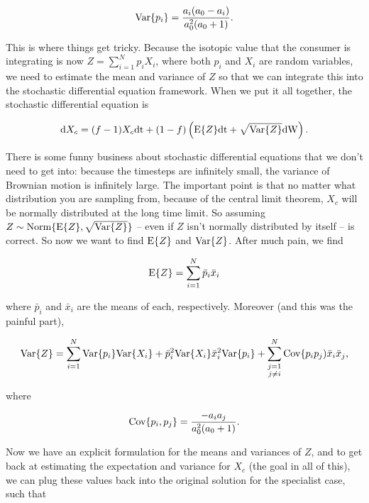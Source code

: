 \documentclass[11pt]{article}
\begin{document}
\begin{equation}
	{\rm Var}\{p_i\} = \frac{a_i(a_0 - a_i)}{a_0^2(a_0 + 1)}.
\end{equation}

This is where things get tricky.
Because the isotopic value that the consumer is integrating is now $Z = \sum_{i=1}^Np_iX_i$, where both $p_i$ and $X_i$ are random variables, we need to estimate the mean and variance of $Z$ so that we can integrate this into the stochastic differential equation framework.
When we put it all together, the stochastic differential equation is

\begin{equation}
{\rm d}X_c = (f-1)X_c{\rm dt} + (1-f)\left({\rm E}\{Z\} {\rm dt} + \sqrt{{\rm Var}\{Z\}}{\rm dW}\right).
\end{equation}

There is some funny business about stochastic differential equations that we don't need to get into: because the timesteps are infinitely small, the variance of Brownian motion is infinitely large.
The important point is that no matter what distribution you are sampling from, because of the central limit theorem, $X_c$ will be normally distributed at the long time limit.
So assuming $Z \sim {\rm Norm}\{{\rm E}\{Z\}, \sqrt{{\rm Var}\{Z\}}\}$ -- even if $Z$ isn't normally distributed by itself -- is correct.
So now we want to find ${\rm E}\{Z\}$ and ${\rm Var}\{Z\}$.
After much pain, we find

\begin{equation}
	{\rm E}\{Z\} = \sum_{i=1}^N \bar{p}_i \bar{x}_i	
\end{equation}

\noindent where $\bar{p}_i$ and $\bar{x}_i$ are the means of each, respectively.
Moreover (and this was the painful part),

\begin{equation}
	{\rm Var}\{Z\} = \sum_{i=1}^N {\rm Var}\{p_i\}{\rm Var}\{X_i\} + \bar{p}_i^2{\rm Var}\{X_i\} \bar{x}_i^2 {\rm Var}\{p_i\} + \sum_{\substack{
	j=1 \\
	j \neq i}							
	}^N {\rm Cov}\{p_ip_j)\bar{x}_i\bar{x}_j,
\end{equation}

\noindent where 

\begin{equation}
	{\rm Cov}\{p_i,p_j\} = \frac{-a_ia_j}{a_0^2(a_0 + 1)}.
\end{equation}

Now we have an explicit formulation for the means and variances of $Z$, and to get back at estimating the expectation and variance for $X_c$ (the goal in all of this), we can plug these values back into the original solution for the specialist case, such that
\end{document}
